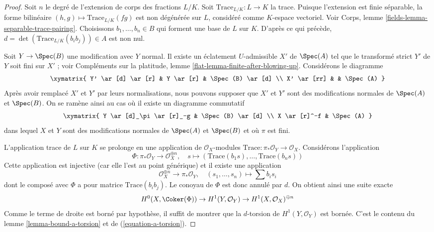 \begin{proof} Soit $n$ le degré de l'extension de corps des fractions $L/K$. Soit $\text{Trace}_{L/K} : L \to K$ la trace. Puisque l'extension est finie séparable, la forme bilinéaire $(h, g) \mapsto \text{Trace}_{L/K}(fg)$ est non dégénérée sur $L$, considéré comme $K$-espace vectoriel. Voir Corps, lemme \ref{fields-lemma-separable-trace-pairing}. Choisissons $b_1, \ldots, b_n \in B$ qui forment une base de $L$ sur $K$. D'après ce qui précède, $d = \det(\text{Trace}_{L/K}(b_ib_j)) \in A$ est non nul.

\medskip\noindent Soit $Y \to \Spec(B)$ une modification avec $Y$ normal. Il existe un éclatement $U$-admissible $X'$ de $\Spec(A)$ tel que le transformé strict $Y'$ de $Y$ soit fini sur $X'$ ; voir Compléments sur la platitude, lemme \ref{flat-lemma-finite-after-blowing-up}. Considérons le diagramme $$
\xymatrix{
Y' \ar[d] \ar[r] & Y \ar[r] & \Spec(B) \ar[d] \\
X' \ar[rr] & & \Spec(A)
}
$$ Après avoir remplacé $X'$ et $Y'$ par leurs normalisations, nous pouvons supposer que $X'$ et $Y'$ sont des modifications normales de $\Spec(A)$ et $\Spec(B)$. On se ramène ainsi au cas où il existe un diagramme commutatif $$
\xymatrix{
Y \ar[d]_\pi \ar[r]_-g & \Spec(B) \ar[d] \\
X \ar[r]^-f & \Spec(A)
}
$$ dans lequel $X$ et $Y$ sont des modifications normales de $\Spec(A)$ et $\Spec(B)$ et où $\pi$ est fini.

\medskip\noindent L'application trace de $L$ sur $K$ se prolonge en une application de $\mathcal{O}_X$-modules $\text{Trace} : \pi_*\mathcal{O}_Y \to \mathcal{O}_X$. Considérons l'application $$
\Phi : \pi_*\mathcal{O}_Y \longrightarrow \mathcal{O}_X^{\oplus n},\quad
s \longmapsto (\text{Trace}(b_1s), \ldots, \text{Trace}(b_ns))
$$ Cette application est injective (car elle l'est au point générique) et il existe une application $$
\mathcal{O}_X^{\oplus n} \longrightarrow \pi_*\mathcal{O}_Y,\quad
(s_1, \ldots, s_n) \longmapsto \sum b_i s_i
$$ dont le composé avec $\Phi$ a pour matrice $\text{Trace}(b_ib_j)$. Le conoyau de $\Phi$ est donc annulé par $d$. On obtient ainsi une suite exacte $$
H^0(X, \Coker(\Phi)) \to H^1(Y, \mathcal{O}_Y) \to
H^1(X, \mathcal{O}_X)^{\oplus n}
$$ Comme le terme de droite est borné par hypothèse, il suffit de montrer que la $d$-torsion de $H^1(Y, \mathcal{O}_Y)$ est bornée. C'est le contenu du lemme \ref{lemma-bound-a-torsion} et de (\ref{equation-a-torsion}). \end{proof}


